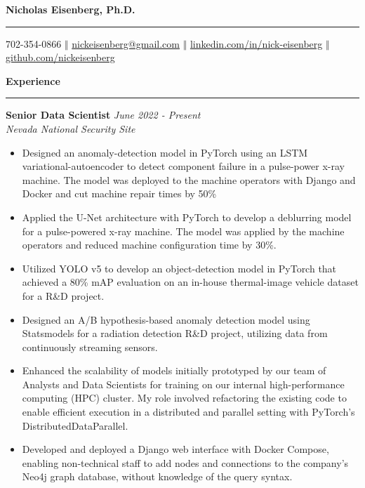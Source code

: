 \documentclass[12pt]{article}
\begin{document}
 \thispagestyle{empty}

\begin{center} \bf \Huge  Nicholas Eisenberg, Ph.D. \vspace{.1em} \hrule
\end{center}

\begin{center} \vspace{0em} 702-354-0866 $\Big \Vert$
	\href{mailto:nickeisenberg@gmail.com}{nickeisenberg@gmail.com} $\Big \Vert$
	\href{https://www.linkedin.com/in/nick-eisenberg/}{linkedin.com/in/nick-eisenberg}
	$\Big \Vert$
	\href{https://github.com/nickeisenberg}{github.com/nickeisenberg}
\end{center}

\textbf{\Large Experience} \vspace{.2em} \hrule

\textbf{\large Senior Data Scientist} \hfill \textit{June 2022 - Present}\\
\textit{Nevada National Security Site}

\begin{itemize} \setlength\itemsep{-.4em}
	\item Designed an anomaly-detection model in PyTorch using an LSTM
	      variational-autoencoder to detect component failure in a pulse-power x-ray
	      machine. The model was deployed to the machine operators with Django and Docker
	      and cut machine repair times by 50\%

	\item Applied the U-Net architecture with PyTorch to develop a deblurring
	      model for a pulse-powered x-ray machine. The model was applied by the
	      machine operators and reduced machine configuration time by 30\%.

	\item Utilized YOLO v5 to develop an
	      object-detection model in PyTorch that achieved a 80\% mAP evaluation on an
	      in-house thermal-image vehicle dataset for a R\&D project.

	\item Designed an A/B hypothesis-based anomaly detection model using
	      Statsmodels for a radiation detection R\&D project, utilizing data from
	      continuously streaming sensors.

	\item Enhanced the scalability of models initially prototyped by our team of
	      Analysts and Data Scientists for training on our internal high-performance
	      computing (HPC) cluster. My role involved refactoring the existing code to
	      enable efficient execution in a distributed and parallel setting with
	      PyTorch's DistributedDataParallel.

	\item Developed and deployed a Django web interface with Docker Compose,
	      enabling non-technical staff to add nodes and connections to the company's
	      Neo4j graph database, without knowledge of the query syntax.
\end{itemize}
\end{document}

